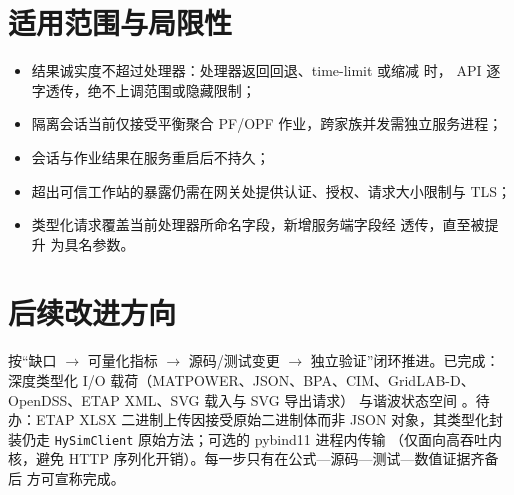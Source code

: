 \documentclass[UTF8,fontset=fandol,a4paper,11pt]{ctexart}
\begin{document}
\section{适用范围与局限性}
\begin{itemize}
  \item 结果诚实度不超过处理器：处理器返回回退、time-limit 或缩减  时，
        API 逐字透传，绝不上调范围或隐藏限制；
  \item 隔离会话当前仅接受平衡聚合 PF/OPF 作业，跨家族并发需独立服务进程；
  \item 会话与作业结果在服务重启后不持久；
  \item 超出可信工作站的暴露仍需在网关处提供认证、授权、请求大小限制与 TLS；
  \item 类型化请求覆盖当前处理器所命名字段，新增服务端字段经  透传，直至被提升
        为具名参数。
\end{itemize}

\section{后续改进方向}
按“缺口 $\to$ 可量化指标 $\to$ 源码/测试变更 $\to$ 独立验证”闭环推进。已完成：深度类型化
I/O 载荷（MATPOWER、JSON、BPA、CIM、GridLAB-D、OpenDSS、ETAP XML、SVG 载入与 SVG 导出请求）
与谐波状态空间 。待办：ETAP XLSX 二进制上传因接受原始二进制体而非
JSON 对象，其类型化封装仍走 \texttt{HySimClient} 原始方法；可选的 pybind11 进程内传输
（仅面向高吞吐内核，避免 HTTP 序列化开销）。每一步只有在公式—源码—测试—数值证据齐备后
方可宣称完成。


\end{document}
